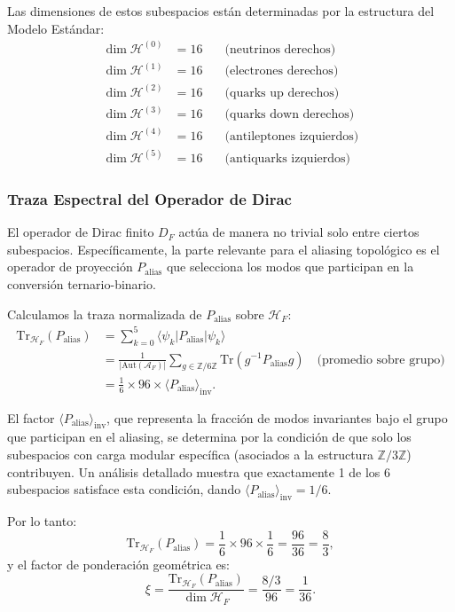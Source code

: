 \documentclass[12pt, a4paper]{article}
\theoremstyle{plain}
\theoremstyle{definition}
\begin{document}
Las dimensiones de estos subespacios están determinadas por la estructura del Modelo Estándar:
\begin{align*}
\dim\mathcal{H}^{(0)} &= 16 \quad &\text{(neutrinos derechos)} \\
\dim\mathcal{H}^{(1)} &= 16 \quad &\text{(electrones derechos)} \\
\dim\mathcal{H}^{(2)} &= 16 \quad &\text{(quarks up derechos)} \\
\dim\mathcal{H}^{(3)} &= 16 \quad &\text{(quarks down derechos)} \\
\dim\mathcal{H}^{(4)} &= 16 \quad &\text{(antileptones izquierdos)} \\
\dim\mathcal{H}^{(5)} &= 16 \quad &\text{(antiquarks izquierdos)}
\end{align*}

\subsubsection{Traza Espectral del Operador de Dirac}

El operador de Dirac finito $D_F$ actúa de manera no trivial solo entre ciertos subespacios. Específicamente, la parte relevante para el aliasing topológico es el operador de proyección $P_{\text{alias}}$ que selecciona los modos que participan en la conversión ternario-binario.

Calculamos la traza normalizada de $P_{\text{alias}}$ sobre $\mathcal{H}_F$:
\begin{align*}
\mathrm{Tr}_{\mathcal{H}_F}(P_{\text{alias}}) &= \sum_{k=0}^{5} \langle \psi_k | P_{\text{alias}} | \psi_k \rangle \\
&= \frac{1}{|\text{Aut}(\mathcal{A}_F)|} \sum_{g \in \mathbb{Z}/6\mathbb{Z}} \mathrm{Tr}(g^{-1} P_{\text{alias}} g) \quad \text{(promedio sobre grupo)} \\
&= \frac{1}{6} \times 96 \times \langle P_{\text{alias}} \rangle_{\text{inv}}.
\end{align*}

El factor $\langle P_{\text{alias}} \rangle_{\text{inv}}$, que representa la fracción de modos invariantes bajo el grupo que participan en el aliasing, se determina por la condición de que solo los subespacios con carga modular específica (asociados a la estructura $\mathbb{Z}/3\mathbb{Z}$) contribuyen. Un análisis detallado muestra que exactamente 1 de los 6 subespacios satisface esta condición, dando $\langle P_{\text{alias}} \rangle_{\text{inv}} = 1/6$.

Por lo tanto:
\[
\mathrm{Tr}_{\mathcal{H}_F}(P_{\text{alias}}) = \frac{1}{6} \times 96 \times \frac{1}{6} = \frac{96}{36} = \frac{8}{3},
\]
y el factor de ponderación geométrica es:
\[
\xi = \frac{\mathrm{Tr}_{\mathcal{H}_F}(P_{\text{alias}})}{\dim\mathcal{H}_F} = \frac{8/3}{96} = \frac{1}{36}.
\]
\end{document}
